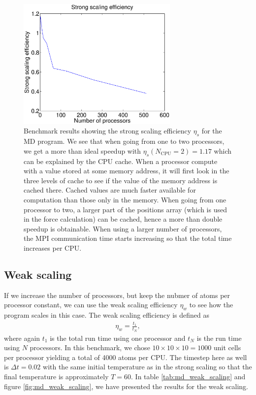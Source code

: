 \begin{figure}[h!]
\begin{center}
\includegraphics[width=0.7\textwidth, trim=0cm 0cm 0cm 0cm, clip]{MD/figures/strong_scaling.eps}
\end{center}
\caption{Benchmark results showing the strong scaling efficiency $\eta_s$ for the MD program. We see that when going from one to two processors, we get a more than ideal speedup with $\eta_s(N_\text{CPU}=2)=1.17$ which can be explained by the CPU cache. When a processor compute with a value stored at some memory address, it will first look in the three levels of cache to see if the value of the memory address is cached there. Cached values are much faster available for computation than those only in the memory. When going from one processor to two, a larger part of the positions array (which is used in the force calculation) can be cached, hence a more than double speedup is obtainable. When using a larger number of processors, the MPI communication time starts increasing so that the total time increases per CPU.}
\label{fig:md_strong_scaling}
\end{figure}

\subsection{Weak scaling}
If we increase the number of processors, but keep the nubmer of atoms per processor constant, we can use the weak scaling efficiency $\eta_w$ to see how the program scales in this case. The weak scaling efficiency is defined as
\begin{align}
	\eta_w = \frac{t_1}{t_N},
\end{align}
where again $t_1$ is the total run time using one processor and $t_N$ is the run time using $N$ processors. In this benchmark, we chose $10\times10\times10=1000$ unit cells per processor yielding a total of 4000 atoms per CPU. The timestep here as well is $\Delta t = 0.02$ with the same initial temperature as in the strong scaling so that the final temperature is approximately $T=$\unit{60}{\kelvin}. In table \ref{tab:md_weak_scaling} and figure \ref{fig:md_weak_scaling}, we have presented the results for the weak scaling. 

